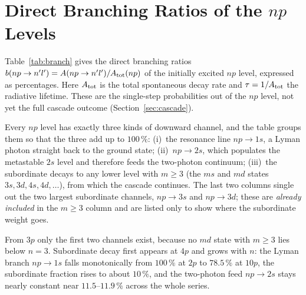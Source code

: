 \documentclass[english,a4paper]{my_memo}
\begin{document}
\section{Direct Branching Ratios of the $np$ Levels}

Table~\ref{tab:branch} gives the direct branching ratios
$b(np \to n'l') = A(np \to n'l')/A_{\rm tot}(np)$ of the initially excited
$np$ level, expressed as percentages.  Here $A_{\rm tot}$ is the total
spontaneous decay rate and $\tau = 1/A_{\rm tot}$ the radiative lifetime.
These are the single-step probabilities out of the $np$ level, not yet the
full cascade outcome (Section~\ref{sec:cascade}).

Every $np$ level has exactly three kinds of downward channel, and the table
groups them so that the three add up to $100\,\%$:
(i)~the resonance line $np \to 1s$, a Lyman photon straight back to the ground
state;
(ii)~$np \to 2s$, which populates the metastable $2s$ level and therefore
feeds the two-photon continuum;
(iii)~the subordinate decays to any lower level with $m \ge 3$ (the $ms$ and
$md$ states $3s, 3d, 4s, 4d, \dots$), from which the cascade continues.
The last two columns single out the two largest subordinate channels,
$np \to 3s$ and $np \to 3d$; these are \emph{already included} in the
$m \ge 3$ column and are listed only to show where the subordinate weight
goes.

From $3p$ only the first two channels exist, because no $md$ state with
$m \ge 3$ lies below $n = 3$.  Subordinate decay first appears at $4p$ and
grows with $n$: the Lyman branch $np \to 1s$ falls monotonically from
$100\,\%$ at $2p$ to $78.5\,\%$ at $10p$, the subordinate fraction rises to
about $10\,\%$, and the two-photon feed $np \to 2s$ stays nearly constant
near $11.5$--$11.9\,\%$ across the whole series.
\end{document}
